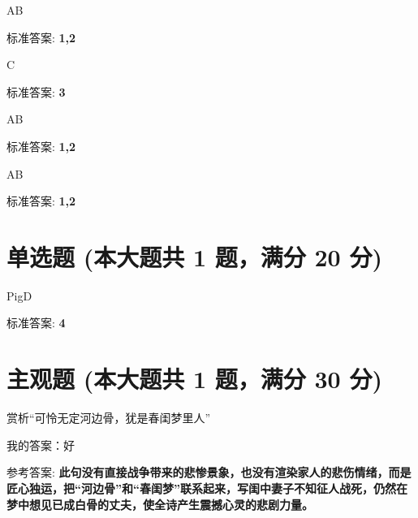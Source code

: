 \documentclass[12pt, a4paper, addpoints, answers]{exam}
\begin{document}
\begin{questions}
\question[5] AB

\begin{oneparcheckboxes}
\end{oneparcheckboxes}

标准答案: \textbf{1,2}

\question[5] C

\begin{oneparcheckboxes}
\end{oneparcheckboxes}

标准答案: \textbf{3}

\question[5] AB

\begin{oneparcheckboxes}
\end{oneparcheckboxes}

标准答案: \textbf{1,2}

\question[5] AB

\begin{oneparcheckboxes}
\end{oneparcheckboxes}

标准答案: \textbf{1,2}

\end{questions}

\hspace{5cm}

\section{\normalsize{单选题 (本大题共 1 题，满分 20 分)}}
\hspace{1.5cm}

\begin{questions}
\question[20] PigD

\begin{oneparchoices}
\end{oneparchoices}

标准答案: \textbf{4}

\end{questions}

\hspace{5cm}

\section{\normalsize{主观题 (本大题共 1 题，满分 30 分)}}
\hspace{1.5cm}

\begin{questions}
\question[30] 赏析“可怜无定河边骨，犹是春闺梦里人”

我的答案：好

参考答案: \textbf{此句没有直接战争带来的悲惨景象，也没有渲染家人的悲伤情绪，而是匠心独运，把“河边骨”和“春闺梦”联系起来，写闺中妻子不知征人战死，仍然在梦中想见已成白骨的丈夫，使全诗产生震撼心灵的悲剧力量。}

\end{questions}
\end{document}
